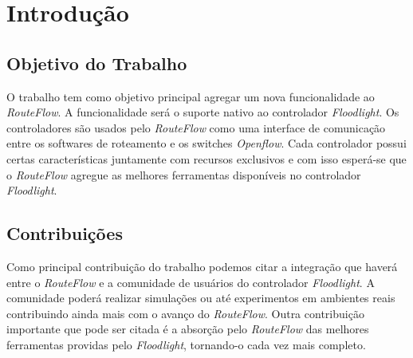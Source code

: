 \chapter{Introdução}

\section{Objetivo do Trabalho}
O trabalho tem como objetivo principal agregar um nova funcionalidade ao \textit{RouteFlow}. A funcionalidade será o suporte nativo ao controlador \textit{Floodlight}. Os controladores são usados pelo \textit{RouteFlow} como uma interface de comunicação entre os softwares de roteamento e os switches \textit{Openflow}. Cada controlador possui certas características juntamente com recursos exclusivos e com isso esperá-se que o \textit{RouteFlow} agregue as melhores ferramentas disponíveis no controlador \textit{Floodlight}.

\section{Contribuições}
Como principal contribuição do trabalho podemos citar a integração que haverá entre o \textit{RouteFlow} e a comunidade de usuários do controlador \textit{Floodlight}. A comunidade poderá realizar simulações ou até experimentos em ambientes reais contribuindo ainda mais com o avanço do \textit{RouteFlow}. Outra contribuição importante que pode ser citada é a absorção pelo  \textit{RouteFlow} das melhores ferramentas providas pelo \textit{Floodlight}, tornando-o cada vez mais completo.
